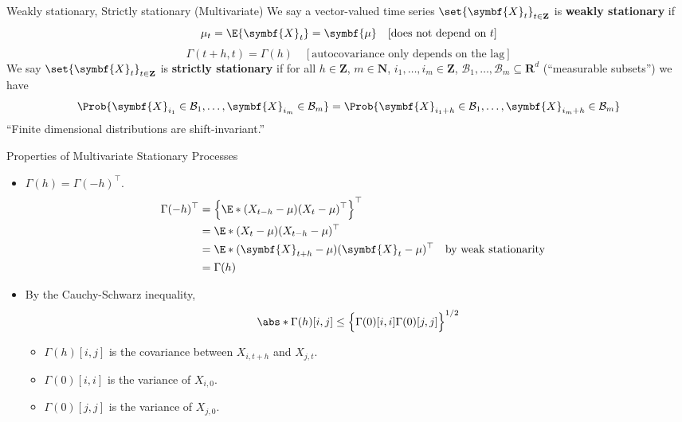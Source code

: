 \begin{Definition}{Weakly stationary, Strictly stationary (Multivariate)}{}
    We say a vector-valued time series $ \set{\symbf{X}_t}_{t\in\mathbf{Z}} $
    is \textbf{weakly stationary} if
    \[ \mu_t=\E{\symbf{X}_t}=\symbf{\mu}\quad[\text{does not depend on $ t $}] \]
    \[ \Gamma(t+h,t)=\Gamma(h)\quad[\text{autocovariance only depends on the lag}] \]
    We say $ \set{\symbf{X}_t}_{t\in\mathbf{Z}} $ is \textbf{strictly stationary}
    if for all $ h\in\mathbf{Z} $, $ m\in\mathbf{N} $, $ i_1,\ldots,i_m\in\mathbf{Z} $,
    $ \mathcal{B}_1,\ldots,\mathcal{B}_m\subseteq \mathbf{R}^d $ (``measurable subsets'') we have
    \[ \Prob{\symbf{X}_{i_1}\in \mathcal{B}_1,\ldots,\symbf{X}_{i_m}\in\mathcal{B}_m}=
        \Prob{\symbf{X}_{i_1+h}\in \mathcal{B}_1,\ldots, \symbf{X}_{i_m+h}\in \mathcal{B}_m} \]
    ``Finite dimensional distributions are shift-invariant.''
\end{Definition}
\begin{Proposition}{Properties of Multivariate Stationary Processes}{}
    \begin{itemize}
        \item $ \Gamma(h)=\Gamma(-h)^\top $.
              \begin{align*}
                  \Gamma(-h)^\top
                   & =\Bigl\{\E*{(X_{t-h}-\mu)(X_t-\mu)^\top}\Bigr\}^\top                                  \\
                   & =\E*{(X_t-\mu)(X_{t-h}-\mu)^\top}                                                     \\
                   & =\E*{(\symbf{X}_{t+h}-\mu)(\symbf{X}_t-\mu)^\top}    &  & \text{by weak stationarity} \\
                   & =\Gamma(h)
              \end{align*}
        \item By the Cauchy-Schwarz inequality,
              \[ \abs*{\Gamma(h)[i,j]}\le \Bigl\{\Gamma(0)[i,i]\Gamma(0)[j,j]\Bigr\}^{1/2} \]
              \begin{itemize}
                  \item $ \Gamma(h)[i,j] $ is the covariance between $ X_{i,t+h} $ and $ X_{j,t} $.
                  \item $ \Gamma(0)[i,i] $ is the variance of $ X_{i,0} $.
                  \item $ \Gamma(0)[j,j] $ is the variance of $ X_{j,0} $.
              \end{itemize}
    \end{itemize}
\end{Proposition}
